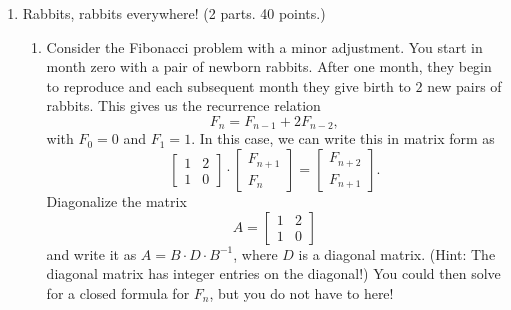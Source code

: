 \documentclass[10pt]{amsart}
\newcommand{\F}{\mathbb F}
\begin{document}
\begin{enumerate}
\item {\sc Rabbits, rabbits everywhere!}  (2 parts.  40 points.)
\begin{enumerate}
\item Consider the Fibonacci problem with a minor adjustment.  You start in
month zero with a pair of newborn rabbits.  After one month, they
begin to reproduce and each subsequent month they give birth to $2$
new pairs of rabbits.  This gives us the recurrence relation
$$
F_n=F_{n-1}+2F_{n-2},
$$
with $F_0=0$ and $F_1=1$.  In this case, we can write this in matrix
form as
$$
\left[\begin{array}{cc}1&2\\1&0\end{array}\right]
\cdot\left[\begin{array}{c}F_{n+1}\\F_n\end{array}\right]
=\left[\begin{array}{c}F_{n+2}\\F_{n+1}\end{array}\right].
$$
Diagonalize the matrix
$$
A=\left[\begin{array}{cc}1&2\\1&0\end{array}\right]
$$
and write it as $A=B\cdot D\cdot B^{-1}$, where $D$ is a diagonal
matrix. ({\sc Hint:} The diagonal matrix has integer entries on the diagonal!)
You could then solve for a closed formula for $F_n$, but you do not have
to here!


\vfill
\end{enumerate}


\end{enumerate}
\end{document}
